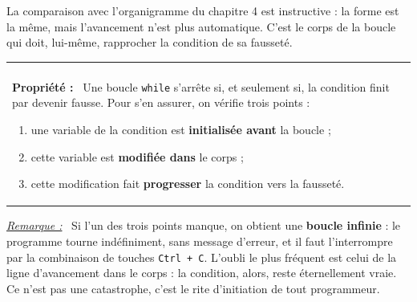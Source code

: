 \documentclass[a4paper,11pt,openany]{book}
\makeatletter
\newcommand{\mot}[1]{\textcolor{rougecours}{\textbf{#1}}}
\newcommand{\code}[1]{\texttt{\textcolor{codebleu}{#1}}}
\newenvironment{cadre}%
 {\par\vspace{2mm}\noindent\begin{tabular}{|@{\hspace{4mm}}p{0.93\textwidth}@{\hspace{4mm}}|}
  \hline \\[-2mm]}%
 {\\[2mm] \hline \end{tabular}\par\vspace{3mm}}
\newcommand{\propo}[1]{\textbf{Propriété #1 :}~}
\newenvironment{remarque}%
 {\par\vspace{1mm}\begin{list}{}{\leftmargin=1cm \rightmargin=0.5cm}\item[]%
  \textit{\underline{Remarque :}}~}%
 {\end{list}\vspace{1mm}}
\makeatother
\begin{document}
\begin{center}
\end{center}

La comparaison avec l'organigramme du chapitre 4 est instructive : la forme est la même, mais l'avancement n'est plus automatique. C'est le corps de la boucle qui doit, lui-même, rapprocher la condition de sa fausseté.

\begin{cadre}
\propo{} Une boucle \code{while} s'arrête si, et seulement si, la condition finit par devenir fausse. Pour s'en assurer, on vérifie trois points :
\begin{enumerate}[leftmargin=8mm,itemsep=0.5mm,topsep=1mm]
\item une variable de la condition est \textbf{initialisée avant} la boucle ;
\item cette variable est \textbf{modifiée dans} le corps ;
\item cette modification fait \textbf{progresser} la condition vers la fausseté.
\end{enumerate}
\end{cadre}

\begin{remarque}
Si l'un des trois points manque, on obtient une \mot{boucle infinie} : le programme tourne indéfiniment, sans message d'erreur, et il faut l'interrompre par la combinaison de touches \code{Ctrl + C}. L'oubli le plus fréquent est celui de la ligne d'avancement dans le corps : la condition, alors, reste éternellement vraie. Ce n'est pas une catastrophe, c'est le rite d'initiation de tout programmeur.
\end{remarque}
\end{document}
